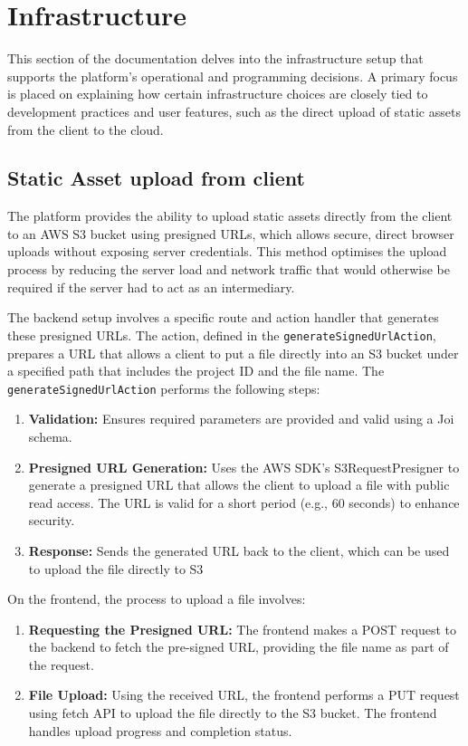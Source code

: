 \section{Infrastructure}
\label{attachments:programming-platform.infrastructure}
This section of the documentation delves into the infrastructure setup that supports the platform's operational and programming decisions. A primary focus is placed on explaining how certain infrastructure choices are closely tied to development practices and user features, such as the direct upload of static assets from the client to the cloud. 

\subsection{Static Asset upload from client}
The platform provides the ability to upload static assets directly from the client to an AWS S3 bucket using presigned URLs, which allows secure, direct browser uploads without exposing server credentials. 
This method optimises the upload process by reducing the server load and network traffic that would otherwise be required if the server had to act as an intermediary.

The backend setup involves a specific route and action handler that generates these presigned URLs. The action, defined in the \texttt{generateSignedUrlAction}, prepares a URL that allows a client to put a file directly into an S3 bucket under a specified path that includes the project ID and the file name.
The \texttt{generateSignedUrlAction} performs the following steps:
\begin{enumerate}
    \item \textbf{Validation:} Ensures required parameters are provided and valid using a Joi schema.
    \item \textbf{Presigned URL Generation:} Uses the AWS SDK's S3RequestPresigner to generate a presigned URL that allows the client to upload a file with public read access. The URL is valid for a short period (e.g., 60 seconds) to enhance security.
    \item \textbf{Response:} Sends the generated URL back to the client, which can be used to upload the file directly to S3
\end{enumerate}

On the frontend, the process to upload a file involves:
\begin{enumerate}
    \item \textbf{Requesting the Presigned URL:} The frontend makes a POST request to the backend to fetch the pre-signed URL, providing the file name as part of the request.
    \item \textbf{File Upload:} Using the received URL, the frontend performs a PUT request using fetch API to upload the file directly to the S3 bucket. The frontend handles upload progress and completion status.
\end{enumerate}

